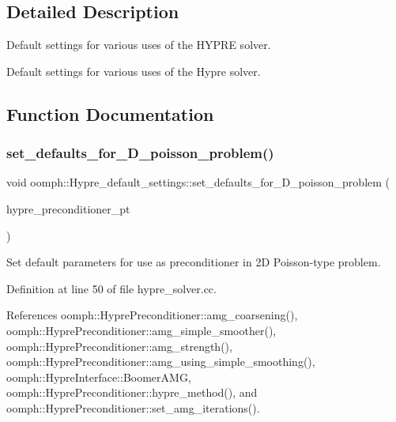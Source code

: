 \subsection{Detailed Description}
Default settings for various uses of the H\+Y\+P\+RE solver. 

Default settings for various uses of the Hypre solver. 

\subsection{Function Documentation}
\mbox{\label{namespaceoomph_1_1Hypre__default__settings_a8e616a1267ca88b82032b059ab573241}} 
\subsubsection{\texorpdfstring{set\+\_\+defaults\+\_\+for\+\_\+D\+\_\+poisson\+\_\+problem()}{set\_defaults\_for\_2D\_poisson\_problem()}}
{\footnotesize\ttfamily void oomph\+::\+Hypre\+\_\+default\+\_\+settings\+::set\+\_\+defaults\+\_\+for\+\_\+D\+\_\+poisson\+\_\+problem (\begin{DoxyParamCaption}\item[{\hyperlink{classoomph_1_1HyprePreconditioner}{Hypre\+Preconditioner} $\ast$}]{hypre\+\_\+preconditioner\+\_\+pt }\end{DoxyParamCaption})}



Set default parameters for use as preconditioner in 2D Poisson-\/type problem. 



Definition at line 50 of file hypre\+\_\+solver.\+cc.



References oomph\+::\+Hypre\+Preconditioner\+::amg\+\_\+coarsening(), oomph\+::\+Hypre\+Preconditioner\+::amg\+\_\+simple\+\_\+smoother(), oomph\+::\+Hypre\+Preconditioner\+::amg\+\_\+strength(), oomph\+::\+Hypre\+Preconditioner\+::amg\+\_\+using\+\_\+simple\+\_\+smoothing(), oomph\+::\+Hypre\+Interface\+::\+Boomer\+A\+MG, oomph\+::\+Hypre\+Preconditioner\+::hypre\+\_\+method(), and oomph\+::\+Hypre\+Preconditioner\+::set\+\_\+amg\+\_\+iterations().



